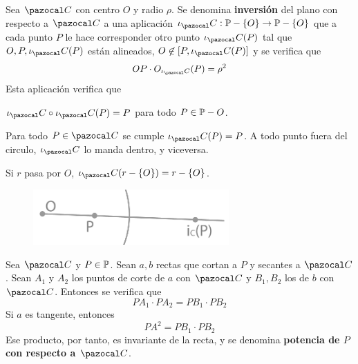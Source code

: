  Sea $\C$ con centro $O$ y radio $\rho$. Se denomina \textbf{inversión} del plano con respecto a $\C$ a una aplicación $\iota_\C: \P- \{O\}\rightarrow \P-\{O\}$ que a cada punto $P$ le hace corresponder otro punto $\iota_\C(P)$ tal que $O, P, \iota_\C(P)$ están alineados, $O\not\in [P, \iota_\C(P)]$ y se verifica que 
$$OP\cdot O_{\iota_\C}(P) = \rho^2$$
Esta aplicación verifica que 
\begin{itemizex}
	\item $\iota_\C\circ \iota_\C(P) = P$ para todo $P\in \P -{O}$.
	\item Para todo $P \in \C$ se cumple $\iota_\C(P) = P$. A todo punto fuera del circulo, $\iota_\C$ lo manda dentro, y viceversa.
	\item Si $r$ pasa por $O$, $\iota_\C(r-\{O\}) = r-\{O\}$.
\end{itemizex}
\begin{figure}[H]
	\centering
	\includegraphics[width=7.5cm]{figuras/8-15.png}
	\vspace{-1em}
\end{figure}
 Sea $\C$ y $P\in \P$. Sean $a, b$ rectas que cortan a $P$ y secantes a $\C$. Sean $A_1$ y $A_2$ los puntos de corte de $a$ con $\C$ y $B_1, B_2$ los de $b$ con $\C$. Entonces se verifica que 
\[PA_1\cdot PA_2 = PB_1 \cdot PB_2  \] 
Si $a$ es tangente, entonces 
\[PA^2 = PB_1 \cdot PB_2  \] 
Ese producto, por tanto, es invariante de la recta, y se denomina \textbf{potencia de $P$ con respecto a $\C$}.

